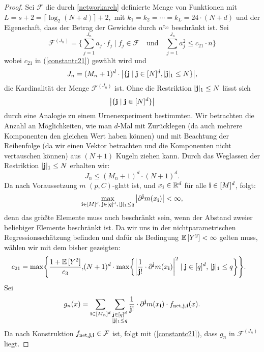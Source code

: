 \begin{proof}
Sei $\mathcal{F}$ die durch \ref{networkarch} definierte Menge von Funktionen mit $L = s + 2 = \lceil\log_2(N + d)\rceil + 2,$ mit $k_1 = k_2 = \cdots = k_L = 24 \cdot (N + d)$ und der Eigenschaft, dass der Betrag der Gewichte durch $n^{c_{20}}$ beschränkt ist. Sei 
$$ \mathcal{F}^{(J_n)} = \biggl\{\sum_{j = 1}^{J_n} a_j \cdot f_j \mid f_j \in \mathcal{F} \quad \text{und} \quad \sum_{j = 1}^{J_n} a_j^2 \leq c_{21} \cdot n \biggr\}$$
wobei $c_{21}$ in (\ref{constantc21}) gewählt wird und
$$J_n = (M_n + 1)^d \cdot \big|\{\mathbf{j} \mid \mathbf{j} \in [N]^d, |\mathbf{j}|_1 \leq N\}\big|,$$ 
die Kardinalität der Menge $\mathcal{F}^{(J_n)}$ ist. 
Ohne die Restriktion $|\mathbf{j}|_1 \leq N$ lässt sich $$\big|\{\mathbf{j} \mid \mathbf{j} \in [N]^d\}\big|$$ durch eine Analogie zu  einem Urnenexperiment bestimmten. Wir betrachten die Anzahl an Möglichkeiten, wie man $d$-Mal mit Zurücklegen (da auch mehrere Komponenten den gleichen Wert haben können) und mit Beachtung der Reihenfolge (da wir einen Vektor betrachten und die Komponenten nicht vertauschen können) aus $(N + 1)$ Kugeln ziehen kann. Durch das Weglassen der Restriktion $|\mathbf{j}|_1 \leq N$ erhalten wir:
\begin{equation}
\label{jn}
J_n \leq (M_n + 1)^d \cdot (N + 1)^d.
\end{equation}
Da nach Voraussetzung $m$ $(p,C)$-glatt ist, und $x_{\mathbf{i}}   \in \mathbb{R}^d$ für alle $\mathbf{i} \in [M]^d$, folgt:
\begin{equation}
\label{bound}
\max_{\mathbf{i} \in [M]^d,\, \mathbf{j} \in [q]^d,\, |\mathbf{j}|_1 \leq q} \big|\partial^{\mathbf{j}}m(x_{\mathbf{i}})\big| < \infty,
\end{equation}
denn das größte Elemente muss auch beschränkt sein, wenn der Abstand zweier beliebiger Elemente beschränkt ist.
Da wir uns in der nichtparametrischen Regressionsschätzung befinden und dafür als Bedingung $\mathbb{E}\,[Y^2] < \infty$ gelten muss, wählen wir mit dem bisher gezeigten:
\begin{equation}
\label{constantc21}
\begin{split}
c_{21} = \max\Biggl\{\frac{1 + \mathbb{E}\,[Y^2]}{c_3}, & (N + 1)^d \cdot \max\biggl\{\bigg| \frac{1}{\mathbf{j}!} \cdot \partial^{\mathbf{j}}m(x_{\mathbf{i}})\bigg|^2 \mid  \mathbf{j} \in [q]^d,\, |\mathbf{j}|_1 \leq q\biggr\}\Biggr\}.
\end{split}
\end{equation}
Sei 
$$g_n(x) = \sum_{\mathbf{i} \in [M_n]^d} \sum_{\substack{ \mathbf{j} \in [q]^d \\ |\mathbf{j}|_1 \leq q}} \frac{1}{\mathbf{j}!} \cdot \partial^{\mathbf{j}}m(x_{\mathbf{i}}) \cdot f_{\mathrm{net},\mathbf{j},\mathbf{i}}(x).$$
Da nach Konstruktion $f_{\mathrm{net},\mathbf{j},\mathbf{i}} \in \mathcal{F}$ ist, folgt mit (\ref{constantc21}), dass $g_n$ in $\mathcal{F}^{(J_n)}$ liegt. 

\end{proof}
